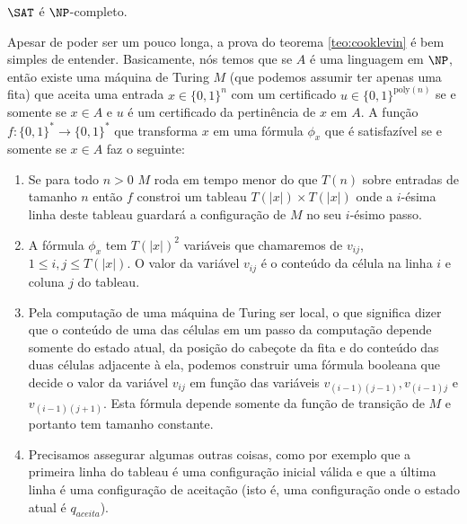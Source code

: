 \begin{teo}  \label{teo:cooklevin}

$\SAT$ é $\NP$-completo.

\end{teo}

Apesar de poder ser um pouco longa, a prova do teorema \ref{teo:cooklevin} é bem simples de entender. Basicamente, nós temos que se $A$ é uma linguagem em $\NP$, então existe uma máquina de Turing $M$ (que podemos assumir ter apenas uma fita) que aceita uma entrada $x \in \{0, 1\}^{n}$ com um certificado $u \in \{0, 1\}^{\text{poly}(n)}$ se e somente se $x \in A$ e $u$ é um certificado da pertinência de $x$ em $A$. A função $f: \{0, 1\}^{*} \to \{0, 1\}^{*}$
que transforma $x$ em uma fórmula $\phi_{x}$ que é satisfazível se e somente se $x \in A$ faz o seguinte:

\begin{enumerate}

\item Se para todo $n > 0$ $M$ roda em tempo menor do que $T(n)$ sobre entradas de tamanho $n$ então $f$ constroi um tableau $T(\lvert x \rvert) \times T(\lvert x \rvert)$ onde a $i$-ésima linha deste tableau guardará a configuração de $M$ no seu $i$-ésimo passo.

\item A fórmula $\phi_{x}$ tem $T(\lvert x \rvert)^{2}$ variáveis que chamaremos de $v_{ij}$, $1 \leq i, j \leq T(\lvert x \rvert)$. O valor da variável $v_{ij}$ é o conteúdo da célula na linha $i$ e coluna $j$ do tableau. 

\item Pela computação de uma máquina de Turing ser local, o que significa dizer que o conteúdo de uma das células em um passo da computação depende somente do estado atual, da posição do cabeçote da fita e do conteúdo das duas células adjacente à ela, podemos construir uma fórmula booleana que decide o valor da variável $v_{ij}$ em função das variáveis $v_{(i - 1)(j - 1)}, v_{(i - 1)j}$ e $v_{(i - 1)(j + 1)}$. Esta fórmula depende somente da função de transição de $M$ e portanto tem tamanho constante.

\item Precisamos assegurar algumas outras coisas, como por exemplo que a primeira linha do tableau é uma configuração inicial válida e que a última linha é uma configuração de aceitação (isto é, uma configuração onde o estado atual é $q_{aceita}$).

\end{enumerate}


